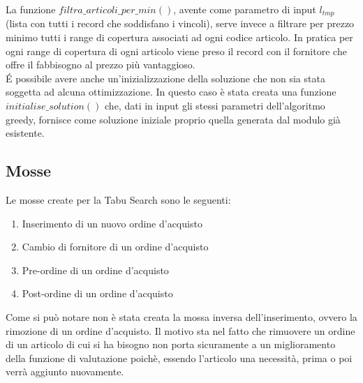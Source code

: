 \noindent La funzione $filtra\_articoli\_per\_min()$, avente come parametro di input $l_{tmp}$ (lista con tutti i record che soddisfano i vincoli),
serve invece a filtrare per prezzo minimo tutti i range di copertura associati ad ogni codice articolo.
In pratica per ogni range di copertura di ogni articolo viene preso il record con il fornitore che offre il fabbisogno al prezzo più vantaggioso.\\

\noindent É possibile avere anche un'inizializzazione della soluzione che non sia stata soggetta ad alcuna ottimizzazione.
In questo caso è stata creata una funzione $initialise\_solution()$ che, dati in input gli stessi parametri dell'algoritmo greedy, fornisce
come soluzione iniziale proprio quella generata dal modulo già esistente. 

\subsection{Mosse}
\label{sec:mosse}
\noindent Le mosse create per la Tabu Search sono le seguenti:
\begin{enumerate}
    \item Inserimento di un nuovo ordine d'acquisto
    \item Cambio di fornitore di un ordine d'acquisto
    \item Pre-ordine di un ordine d'acquisto
    \item Post-ordine di un ordine d'acquisto
\end{enumerate}
Come si può notare non è stata creata la mossa inversa dell'inserimento, ovvero la rimozione di un ordine d'acquisto.
Il motivo sta nel fatto che rimuovere un ordine di un articolo di cui si ha bisogno non porta sicuramente a un miglioramento
della funzione di valutazione poichè, essendo l'articolo una necessità, prima o poi verrà aggiunto nuovamente.

